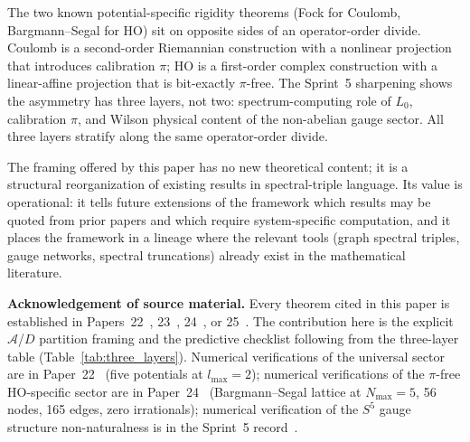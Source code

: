 \documentclass[twocolumn,pra,amsmath,amssymb,superscriptaddress]{revtex4-2}
\begin{document}
The two known potential-specific rigidity theorems (Fock for
Coulomb, Bargmann--Segal for HO) sit on opposite sides of an
operator-order divide.  Coulomb is a second-order Riemannian
construction with a nonlinear projection that introduces calibration
$\pi$; HO is a first-order complex construction with a linear-affine
projection that is bit-exactly $\pi$-free.  The Sprint~5 sharpening
shows the asymmetry has three layers, not two: spectrum-computing
role of $L_0$, calibration $\pi$, and Wilson physical content of the
non-abelian gauge sector.  All three layers stratify along the same
operator-order divide.

The framing offered by this paper has no new theoretical content; it
is a structural reorganization of existing results in
spectral-triple language.  Its value is operational: it tells future
extensions of the framework which results may be quoted from prior
papers and which require system-specific computation, and it places
the framework in a lineage where the relevant tools (graph spectral
triples, gauge networks, spectral truncations) already exist in the
mathematical literature.

\medskip\noindent\textbf{Acknowledgement of source material.}  Every
theorem cited in this paper is established in
Papers~22~\cite{paper22}, 23~\cite{paper23}, 24~\cite{paper24},
or 25~\cite{paper25}.  The contribution here is the explicit
$\mathcal{A}$/$D$ partition framing and the predictive checklist
following from the three-layer table
(Table~\ref{tab:three_layers}).  Numerical verifications of the
universal sector are in Paper~22~\cite{paper22} (five potentials at
$l_{\max} = 2$); numerical verifications of the $\pi$-free
HO-specific sector are in Paper~24~\cite{paper24}
(Bargmann--Segal lattice at $N_{\max} = 5$, 56 nodes, 165 edges,
zero irrationals); numerical verification of the $S^5$ gauge
structure non-naturalness is in the Sprint~5 record~\cite{paper25}.
\end{document}
